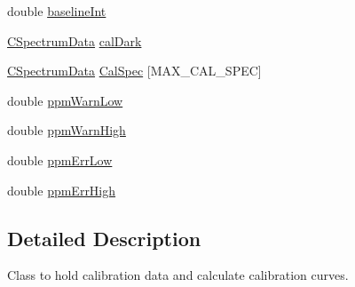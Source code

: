 \begin{DoxyCompactItemize}
\item 
double \hyperlink{classCCalibrationCurve_a2deaf658bd351d099ae5b07faea5fd66}{baselineInt}
\item 
\hyperlink{classCSpectrumData}{CSpectrumData} \hyperlink{classCCalibrationCurve_a824fa0eb0c09eba9bacb327e2647e304}{calDark}
\item 
\hyperlink{classCSpectrumData}{CSpectrumData} \hyperlink{classCCalibrationCurve_a6af9fee76ca40350819d1f8d319be2e2}{CalSpec} \mbox{[}MAX\_\-CAL\_\-SPEC\mbox{]}
\item 
double \hyperlink{classCCalibrationCurve_a5782040dee61541b2bd3d4a213d7a3a6}{ppmWarnLow}
\item 
double \hyperlink{classCCalibrationCurve_a10733d71ce0df543b1b3eeab0bf1bc4b}{ppmWarnHigh}
\item 
double \hyperlink{classCCalibrationCurve_a4889720b95e92b82ede1d3492e8ad350}{ppmErrLow}
\item 
double \hyperlink{classCCalibrationCurve_ab034b5065c9289fc92f9575c02f32506}{ppmErrHigh}
\end{DoxyCompactItemize}


\subsection{Detailed Description}
Class to hold calibration data and calculate calibration curves. 

